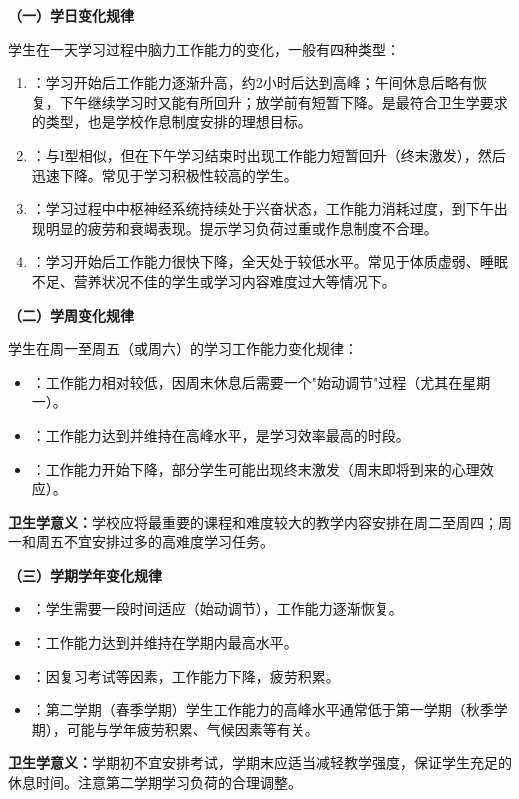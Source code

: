 \begin{keybox}
\textbf{（一）学日变化规律}

学生在一天学习过程中脑力工作能力的变化，一般有四种类型：

\begin{enumerate}[leftmargin=*]
    \item {}：学习开始后工作能力逐渐升高，约2小时后达到高峰；午间休息后略有恢复，下午继续学习时又能有所回升；放学前有短暂下降。是最符合卫生学要求的类型，也是学校作息制度安排的理想目标。
    \item {}：与I型相似，但在下午学习结束时出现工作能力短暂回升（终末激发），然后迅速下降。常见于学习积极性较高的学生。
    \item {}：学习过程中中枢神经系统持续处于兴奋状态，工作能力消耗过度，到下午出现明显的疲劳和衰竭表现。提示学习负荷过重或作息制度不合理。
    \item {}：学习开始后工作能力很快下降，全天处于较低水平。常见于体质虚弱、睡眠不足、营养状况不佳的学生或学习内容难度过大等情况下。
\end{enumerate}

\textbf{（二）学周变化规律}

学生在周一至周五（或周六）的学习工作能力变化规律：

\begin{itemize}[leftmargin=*]
    \item {}：工作能力相对较低，因周末休息后需要一个"始动调节"过程（尤其在星期一）。
    \item {}：工作能力达到并维持在高峰水平，是学习效率最高的时段。
    \item {}：工作能力开始下降，部分学生可能出现终末激发（周末即将到来的心理效应）。
\end{itemize}

\textbf{卫生学意义：}学校应将最重要的课程和难度较大的教学内容安排在周二至周四；周一和周五不宜安排过多的高难度学习任务。

\textbf{（三）学期学年变化规律}

\begin{itemize}[leftmargin=*]
    \item {}：学生需要一段时间适应（始动调节），工作能力逐渐恢复。
    \item {}：工作能力达到并维持在学期内最高水平。
    \item {}：因复习考试等因素，工作能力下降，疲劳积累。
    \item {}：第二学期（春季学期）学生工作能力的高峰水平通常低于第一学期（秋季学期），可能与学年疲劳积累、气候因素等有关。
\end{itemize}

\textbf{卫生学意义：}学期初不宜安排考试，学期末应适当减轻教学强度，保证学生充足的休息时间。注意第二学期学习负荷的合理调整。
\end{keybox}

